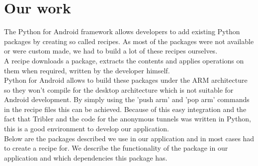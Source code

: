 \documentclass{article}
\begin{document}
\section{Our work}
	The Python for Android framework allows developers to add existing Python packages by creating so called recipes. As most of the packages were not available or were custom made, we had to build a lot of these recipes ourselves.\\

	A recipe downloads a package, extracts the contents and applies operations on them when required, written by the developer himself.\\

	Python for Android allows to build these packages under the ARM architecture so they won't compile for the desktop architecture which is not suitable for Android development. By simply using the 'push arm' and 'pop arm' commands in the recipe files this can be achieved. Because of this easy integration and the fact that Tribler and the code for the anonymous tunnels was written in Python, this is a good environment to develop our application.\\

	Below are the packages described we use in our application and in most cases had to create a recipe for. We describe the functionality of the package in our application and which dependencies this package has.\\
\end{document}
